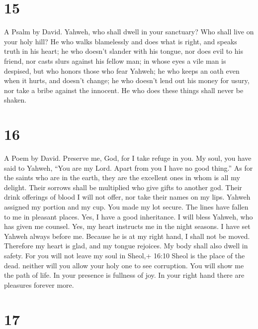 \hypertarget{section-14}{%
\section{15}\label{section-14}}

A Psalm by David.  Yahweh, who shall dwell in your
sanctuary? Who shall live on your holy hill?  He who walks
blamelessly and does what is right, and speaks truth in his heart;
 he who doesn't slander with his tongue, nor does evil to
his friend, nor casts slurs against his fellow man;  in
whose eyes a vile man is despised, but who honors those who fear Yahweh;
he who keeps an oath even when it hurts, and doesn't change;
 he who doesn't lend out his money for usury, nor take a
bribe against the innocent. He who does these things shall never be
shaken.

\hypertarget{section-15}{%
\section{16}\label{section-15}}

A Poem by David.  Preserve me, God, for I take refuge in
you.  My soul, you have said to Yahweh, ``You are my Lord.
Apart from you I have no good thing.''  As for the saints
who are in the earth, they are the excellent ones in whom is all my
delight.  Their sorrows shall be multiplied who give gifts
to another god. Their drink offerings of blood I will not offer, nor
take their names on my lips.  Yahweh assigned my portion and
my cup. You made my lot secure.  The lines have fallen to me
in pleasant places. Yes, I have a good inheritance.  I will
bless Yahweh, who has given me counsel. Yes, my heart instructs me in
the night seasons.  I have set Yahweh always before me.
Because he is at my right hand, I shall not be moved. 
Therefore my heart is glad, and my tongue rejoices. My body shall also
dwell in safety.  For you will not leave my soul in Sheol,+
16:10 Sheol is the place of the dead. neither will you allow your holy
one to see corruption.  You will show me the path of life.
In your presence is fullness of joy. In your right hand there are
pleasures forever more.

\hypertarget{section-16}{%
\section{17}\label{section-16}}

